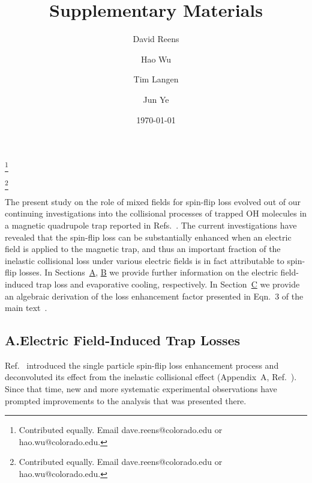 \documentclass[%
 reprint,
 amsmath,amssymb,
 aps,
prl,
]{revtex4-1}
\begin{document}

\title{Supplementary Materials}%

\author{David Reens}
\thanks{Contributed equally. Email dave.reens@colorado.edu or hao.wu@colorado.edu.}

\author{Hao Wu}
\thanks{Contributed equally. Email dave.reens@colorado.edu or hao.wu@colorado.edu.}

\author{Tim Langen}%

\author{Jun Ye}


\date{\today}
\maketitle

\renewcommand{\thefigure}{S\arabic{figure}}
\setcounter{figure}{0}

\renewcommand{\thesubsection}{\alph{subsection}}
\setcounter{subsection}{3}


The present study on the role of mixed fields for spin-flip loss evolved out of our continuing investigations into the collisional processes of trapped OH molecules in a magnetic quadrupole trap reported in Refs.~\cite{Stuhl2013,Stuhl2012evap}. The current investigations have revealed that the spin-flip loss can be substantially enhanced when an electric field is applied to the magnetic trap, and thus an important fraction of the inelastic collisional loss under various electric fields is in fact attributable to spin-flip losses. In Sections~\hyperref[sec:eic]{A}, \hyperref[sec:evap]{B} we provide further information on the electric field-induced trap loss and evaporative cooling, respectively. In Section~\hyperref[sec:der]{C} we provide an algebraic derivation of the loss enhancement factor presented in Eqn.~3 of the main text~\cite{smt}.

\subsection{A.\quad Electric Field-Induced Trap Losses\label{sec:eic}}

Ref.~\cite{Stuhl2013} introduced the single particle spin-flip loss enhancement process and deconvoluted its effect from the inelastic collisional effect (Appendix~A, Ref.~\cite{Stuhl2013}). Since that time, new and more systematic experimental observations have prompted improvements to the analysis that was presented there.
\end{document}
